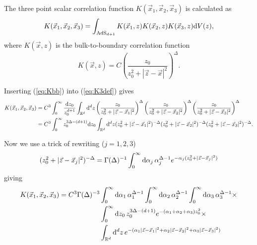 
The three point scalar correlation function $K(\vec{x}_1,\vec{x}_2,\vec{x}_3)$ is calculated as
\begin{equation}\label{eq:K3def}
K(\vec{x}_1,\vec{x}_2,\vec{x}_3) = \int_{\mathrm{AdS}_{d+1}} K(\vec{x}_1,z) K(\vec{x}_2,z) K(\vec{x}_3,z) \mathrm{d} V(z),
\end{equation}
where $K(\vec{x},z)$ is the bulk-to-boundary correlation function
\begin{equation}\label{eq:Kbb}
K(\vec{x},z) = C \left( \frac{z_0}{z_0^2 + |\vec{z}-\vec{x}|^2} \right)^\Delta.\end{equation}

Inserting (\ref{eq:Kbb}) into (\ref{eq:K3def}) gives
\begin{equation*}
\begin{split}
K(\vec{x}_1,\vec{x}_2,\vec{x}_3) &= 
C^3 \int_0^\infty \frac{\mathrm{d} z_0}{z_0^{d+1}} \int_{\mathbb{R}^d} \mathrm{d}^d z 
  \left( \frac{z_0}{z_0^2 + |\vec{z}-\vec{x}_1|^2} \right)^\Delta
  \left( \frac{z_0}{z_0^2 + |\vec{z}-\vec{x}_2|^2} \right)^\Delta
  \left( \frac{z_0}{z_0^2 + |\vec{z}-\vec{x}_3|^2} \right)^\Delta \\
&=
C^3 \int_0^\infty z_0^{3\Delta-(d+1)} \mathrm{d} z_0 \int_{\mathbb{R}^d} \mathrm{d}^d z 
  ( z_0^2 + |\vec{z}-\vec{x}_1|^2 )^{-\Delta}
  ( z_0^2 + |\vec{z}-\vec{x}_2|^2 )^{-\Delta}
  ( z_0^2 + |\vec{z}-\vec{x}_3|^2 )^{-\Delta}
.
\end{split}
\end{equation*}

Now we use a trick of rewriting ($j=1,2,3$)
$$( z_0^2 + |\vec{z}-\vec{x}_j|^2 )^{-\Delta} = 
  \Gamma(\Delta)^{-1} \int_0^\infty \mathrm{d}\alpha_j\, \alpha_j^{\Delta-1} e^{-\alpha_j (z_0^2+|\vec{z}-\vec{x}_j|^2)}$$
giving
\begin{equation}\label{eq:K3multint}
\begin{split}
K(\vec{x}_1,\vec{x}_2,\vec{x}_3) = C^3 \Gamma(\Delta)^{-3}
 &\int_0^\infty \mathrm{d}\alpha_1\, \alpha_1^{\Delta-1}
  \int_0^\infty \mathrm{d}\alpha_2\, \alpha_2^{\Delta-1}
  \int_0^\infty \mathrm{d}\alpha_3\, \alpha_3^{\Delta-1} \times \\
 &\int_0^\infty \mathrm{d} z_0\, z_0^{3\Delta-(d+1)} e^{-(\alpha_1+\alpha_2+\alpha_3)z_0^2} \times \\
 &\int_{\mathbb{R}^d} \mathrm{d}^d z\, e^{-(\alpha_1|\vec{z}-\vec{x}_1|^2 + \alpha_2|\vec{z}-\vec{x}_2|^2 + \alpha_3|\vec{z}-\vec{x}_3|^2)}
\end{split}
\end{equation}

